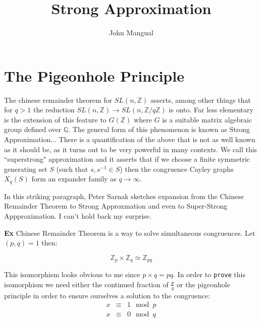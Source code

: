 \documentclass[12pt]{article}
\title{Strong Approximation}
\author{John Mangual}
\date{}
\begin{document}
{\selectfont

\maketitle

\section{ The Pigeonhole Principle }


\hfill\begin{minipage}{\dimexpr\textwidth-2cm}

The chinese remainder theorem for $SL(n, \mathbb{Z})$ asserts, 
among other things that for $q > 1$ the reduction $SL(n, \mathbb{Z}) \to SL(n, \mathbb{Z}/q\mathbb{Z})$ is onto. Far less elementary is the extension of this feature to $G(\mathbb{Z})$ where $G$ is a suitable matrix algebraic group defined over $\mathbb{Q}$.  The general form of this phenomenon is known as Strong Approximation... \newline \newline
There is a quantification of the above that is not as well known as it should be, as it turns out to be very powerful in many contexts.  We call this ``superstrong"  approximation and it asserts that if we choose a finite symmetric generating set $S$ (such that $s, s^{-1} \in S$) then the congruence Cayley graphs $X_q(S)$ form an expander family as $q \to \infty$.

\xdef\tpd{\the\prevdepth}
\end{minipage} \newline

\noindent In this striking paragraph, Peter Sarnak sketches expansion from the Chinese Remainder Theorem to Strong Approxmation and even to Super-Strong Appproximation.  I can't hold back my surprise. \newline


\noindent \textbf{Ex} Chinese Remainder Theorem is a way to solve simultaneous congruences.  Let $(p,q) = 1$ then:

$$ \mathbb{Z}_p \times \mathbb{Z}_q \simeq \mathbb{Z}_{pq}  $$

\noindent This isomorphism looks obvious to me since $p \times q = pq$.  In order to \texttt{prove} this isomorphism we need either the continued fraction of $\frac{p}{q}$ or the pigeonhole principle in order to ensure ourselves a solution to the congruence:
\begin{eqnarray*}
x &\equiv & 1 \mod p \\
x &\equiv & 0 \mod q 
\end{eqnarray*}

}
\end{document}
